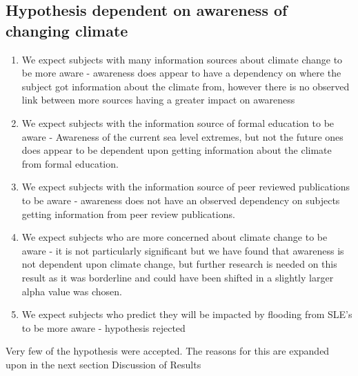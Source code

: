 \subsection{Hypothesis dependent on awareness of changing climate}
\begin{enumerate}
    \item We expect subjects with many information sources about climate change to be more aware - awareness does appear to have a dependency on where the subject got information about the climate from, however there is no observed link between more sources having a greater impact on awareness
    \item We expect subjects with the information source of formal education to be aware - Awareness of the current sea level extremes, but not the future ones does appear to be dependent upon getting information about the climate from formal education. 
    \item We expect subjects with the information source of peer reviewed publications to be aware - awareness does not have an observed dependency on subjects getting information from peer review publications.
    \item We expect subjects who are more concerned about climate change to be aware - it is not particularly significant but we have found that awareness is not dependent upon climate change, but further research is needed on this result as it was borderline and could have been shifted in a slightly larger alpha value was chosen.
    \item We expect subjects who predict they will be impacted by flooding from SLE's to be more aware - hypothesis rejected
\end{enumerate}

Very few of the hypothesis were accepted. The reasons for this are expanded upon in the next section Discussion of Results